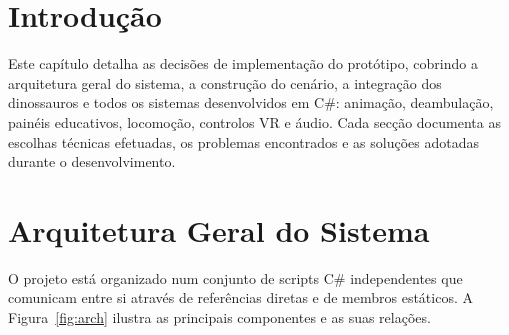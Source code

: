 \documentclass[a4paper,11pt]{report}
\begin{document}
\section{Introdução}

Este capítulo detalha as decisões de implementação do protótipo, cobrindo
a arquitetura geral do sistema, a construção do cenário, a integração dos
dinossauros e todos os sistemas desenvolvidos em C\#: animação, deambulação,
painéis educativos, locomoção, controlos VR e áudio. Cada secção documenta
as escolhas técnicas efetuadas, os problemas encontrados e as soluções
adotadas durante o desenvolvimento.

\section{Arquitetura Geral do Sistema}

O projeto está organizado num conjunto de scripts C\# independentes que
comunicam entre si através de referências diretas e de membros estáticos.
A Figura~\ref{fig:arch} ilustra as principais componentes e as suas relações.
\end{document}
